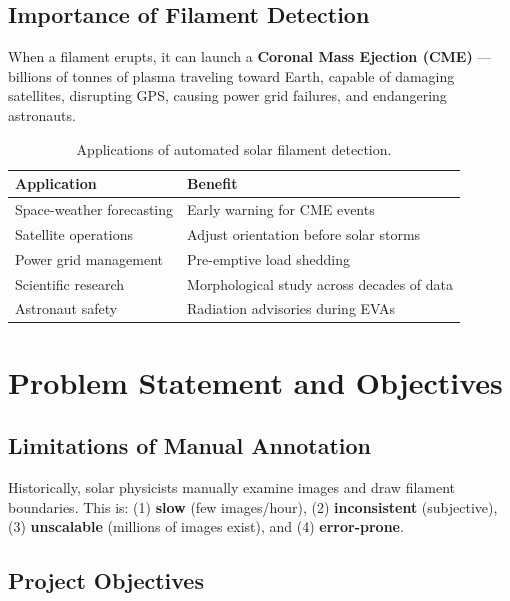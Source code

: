 \documentclass[12pt,a4paper,openany]{report}
\begin{document}
\section{Importance of Filament Detection}

When a filament erupts, it can launch a \textbf{Coronal Mass Ejection (CME)} --- billions of
tonnes of plasma traveling toward Earth, capable of damaging satellites, disrupting GPS,
causing power grid failures, and endangering astronauts.

\begin{table}[H]
\centering
\caption{Applications of automated solar filament detection.}
\renewcommand{\arraystretch}{1.3}
\begin{tabular}{l p{9cm}}
\toprule
\textbf{Application} & \textbf{Benefit} \\
\midrule
Space-weather forecasting & Early warning for CME events \\
Satellite operations      & Adjust orientation before solar storms \\
Power grid management     & Pre-emptive load shedding \\
Scientific research       & Morphological study across decades of data \\
Astronaut safety          & Radiation advisories during EVAs \\
\bottomrule
\end{tabular}
\label{tab:apps}
\end{table}

\chapter{Problem Statement and Objectives}

\section{Limitations of Manual Annotation}

Historically, solar physicists manually examine images and draw filament boundaries.
This is: (1) \textbf{slow} (few images/hour), (2) \textbf{inconsistent} (subjective),
(3) \textbf{unscalable} (millions of images exist), and (4) \textbf{error-prone}.

\section{Project Objectives}
\end{document}
